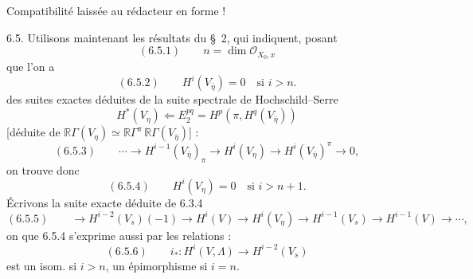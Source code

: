\documentclass[11pt,a4paper]{article}
\begin{document}
Compatibilité laissée au rédacteur en forme !


6.5. Utilisons maintenant les résultats du §~2, qui indiquent,
 posant
\[
(6.5.1)\qquad n = \dim \mathcal{O}_{X_0,x}
\]
que l'on a
\[
(6.5.2)\qquad H^i(V_{\bar\eta}) = 0 \quad \text{si } i > n .
\]
  des  suites exactes déduites
 de la suite spectrale de Hochschild--Serre
\[
H^*(V_\eta) \Longleftarrow E_2^{pq} = H^p(\pi, H^q(V_{\bar\eta}))
\]
[déduite de $\mathbb{R}\Gamma(V_\eta) \simeq \mathbb{R}\Gamma^\pi\,\mathbb{R}\Gamma(V_{\bar\eta})$] :
\[
(6.5.3)\qquad \cdots \longrightarrow H^{i-1}(V_{\bar\eta})_\pi \longrightarrow H^i(V_\eta)
\longrightarrow H^i(V_{\bar\eta})^\pi \longrightarrow 0 ,
\]
on trouve donc
\[
(6.5.4)\qquad H^i(V_\eta) = 0 \quad \text{si } i > n+1 .
\]
 Écrivons la suite exacte déduite de 6.3.4
\[
(6.5.5)\qquad \longrightarrow H^{i-2}(V_s)(-1) \longrightarrow H^i(V) \longrightarrow H^i(V_\eta)
\longrightarrow H^{i-1}(V_s) \longrightarrow H^{i-1}(V) \longrightarrow \cdots ,
\]
on   que 6.5.4 s'exprime aussi par les relations :
\[
(6.5.6)\qquad i_* : H^i(V, \Lambda) \longrightarrow H^{i-2}(V_s)
\]
est un isom. si $i > n$\ill{}, un épimorphisme si $i = n$\ill{}.

\end{document}
